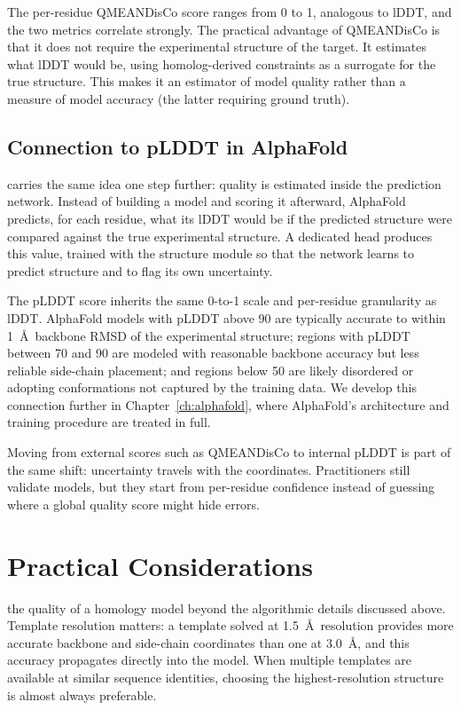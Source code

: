 The per-residue QMEANDisCo score ranges from 0 to 1, analogous to lDDT, and the two metrics correlate strongly. The practical advantage of QMEANDisCo is that it does not require the experimental structure of the target. It estimates what lDDT would be, using homolog-derived constraints as a surrogate for the true structure. This makes it an estimator of model quality rather than a measure of model accuracy (the latter requiring ground truth).

\subsection{Connection to pLDDT in AlphaFold}
\label{subsec:plddt-connection}

 carries the same idea one step further: quality is estimated inside the prediction network. Instead of building a model and scoring it afterward, AlphaFold predicts, for each residue, what its lDDT would be if the predicted structure were compared against the true experimental structure. A dedicated head produces this value, trained with the structure module so that the network learns to predict structure and to flag its own uncertainty.

The pLDDT score inherits the same 0-to-1 scale and per-residue granularity as lDDT. AlphaFold models with pLDDT above 90 are typically accurate to within 1~\AA\ backbone RMSD of the experimental structure; regions with pLDDT between 70 and 90 are modeled with reasonable backbone accuracy but less reliable side-chain placement; and regions below 50 are likely disordered or adopting conformations not captured by the training data. We develop this connection further in Chapter~\ref{ch:alphafold}, where AlphaFold's architecture and training procedure are treated in full.

Moving from external scores such as QMEANDisCo to internal pLDDT is part of the same shift: uncertainty travels with the coordinates. Practitioners still validate models, but they start from per-residue confidence instead of guessing where a global quality score might hide errors.

\section{Practical Considerations}
\label{sec:homology-practical}

 the quality of a homology model beyond the algorithmic details discussed above. Template resolution matters: a template solved at 1.5~\AA\ resolution provides more accurate backbone and side-chain coordinates than one at 3.0~\AA, and this accuracy propagates directly into the model. When multiple templates are available at similar sequence identities, choosing the highest-resolution structure is almost always preferable.

